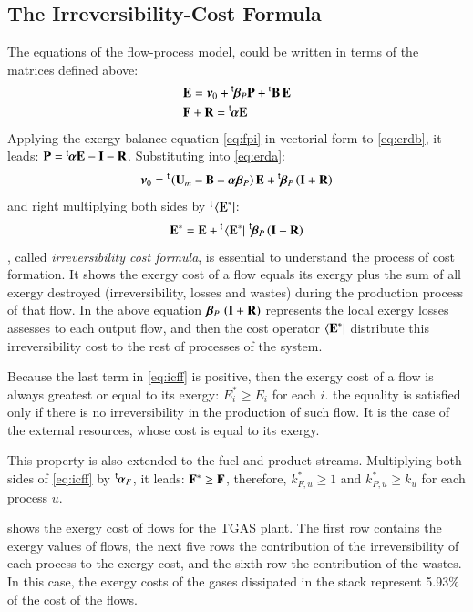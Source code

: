 \documentclass{ecos2018}
\begin{document}
\subsection{The Irreversibility-Cost Formula}
The equations of the flow-process model, could be written in terms of the matrices defined above:
\begin{align}
&\mathbf{E}=\bm{\nu}_0+\prescript{\smash{\mathsf{t}}}{}{\mskip-1mu}\bm{\beta}_P\mathbf{P}+\prescript{\smash{\mathrm{t}}}{}{\mathbf{B}}\,\mathbf{E} \label{eq:erda}\\
&\mathbf{F}+\mathbf{R}=\prescript{\smash{\mathsf{t}}}{}{\mskip-1mu}\bm{\alpha}\mathbf{E} \label{eq:erdb}
\end{align}
Applying the exergy balance equation \cref{eq:fpi} in vectorial form to \cref{eq:erdb}, it leads: ${\mathbf{P}=\prescript{\smash{\mathsf{t}}}{}{\mskip-1mu}\bm{\alpha}\mathbf{E}-\mathbf{I}-\mathbf{R}}$. Substituting into \cref{eq:erda}:
\begin{equation}
\bm{\nu}_0=\prescript{\smash{\mathsf{t}}}{}{\mskip-1mu}\left(\mathbf{U}_m-\mathbf{B}-\bm{\alpha}\bm{\beta}_P\right)\mathbf{E}+\prescript{\smash{\mathsf{t}}}{}{\mskip-1mu}\bm{\beta}_P\left(\mathbf{I}+\mathbf{R}\right)
\end{equation}
and right multiplying both sides by $\prescript{\smash{\mathsf{t}}}{}{\mskip-1mu}\left\langle {\textbf{E}^\ast } \right|$:
\begin{equation}
\label{eq:icff}
\mathbf{E}^*=\mathbf{E}+\prescript{\smash{\mathsf{t}}}{}{\mskip-1mu}\left\langle {\textbf{E}^\ast } \right|\,\prescript{\smash{\mathsf{t}}}{}{\mskip-1mu}\bm{\beta}_P\left(\mathbf{I}+\mathbf{R}\right)
\end{equation}
, called \emph{irreversibility cost formula}, is essential to understand the process of cost formation. It shows the exergy cost of a flow equals its exergy plus the sum of all exergy destroyed (irreversibility, losses and wastes) during the production process of that flow. In the above equation $\bm{\beta}_P\,\left(\mathbf{I}+\mathbf{R}\right)$ represents the local exergy losses assesses to each output flow, and then the cost operator $\left\langle {\textbf{E}^\ast } \right|$  distribute this irreversibility cost to the rest of processes of the system.

Because the last term in \cref{eq:icff} is  positive, then the exergy cost of a flow is always greatest or equal to its exergy: $E_i^* \ge E_i$ for each $i$. the equality is satisfied only if there is no irreversibility in the production of such flow. It is the case of the external resources, whose cost is equal to its exergy. 

This property is also extended to the fuel and product streams. Multiplying both sides of \cref{eq:icff} by $\prescript{\smash{\mathsf{t}}}{}{\mskip-1mu}\bm{\alpha}_F$, it leads: $\mathbf{F}^*\ge\mathbf{F}$, therefore, {$k_{F,u}^{*}\ge 1$} and {$k_{P,u}^{*}\ge k_u$} for each process $u$.

 shows the exergy cost of flows for the TGAS plant.
The first row contains the exergy values of flows, the next five rows the contribution of the irreversibility of each process to the exergy cost, and the sixth row the contribution of the wastes. In this case, the exergy costs of the gases dissipated in the stack represent 5.93\% of the cost of the flows. 
\end{document}
